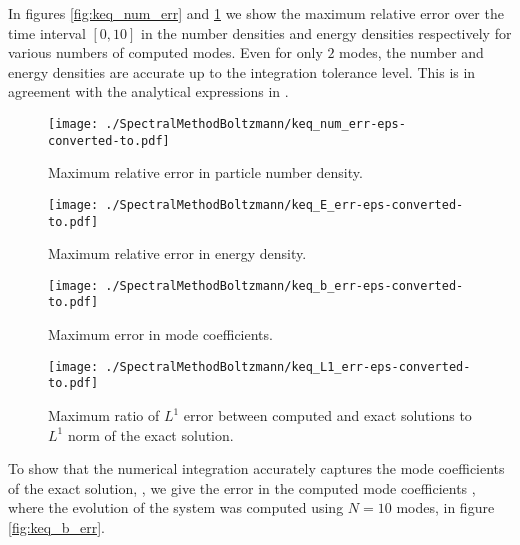In figures \ref{fig:keq_num_err} and  \ref{fig:keq_E_err} we show the maximum relative error over the time interval $[0,10]$ in the number densities and energy densities respectively for various numbers of computed modes. Even for only $2$ modes, the number and energy densities are accurate up to the integration tolerance level.  This is in agreement with the analytical expressions in .

\begin{figure}[H]
 \begin{minipage}[b]{0.5\linewidth}
\centerline{\texttt{[image: ./SpectralMethodBoltzmann/keq\_num\_err-eps-converted-to.pdf]}}
\caption{Maximum relative error in particle number density.}\label{fig:keq_num_err}
 \end{minipage}
 \hspace{0.5cm}
 \begin{minipage}[b]{0.5\linewidth}
\centerline{\texttt{[image: ./SpectralMethodBoltzmann/keq\_E\_err-eps-converted-to.pdf]}}
\caption{Maximum relative error in energy density.}\label{fig:keq_E_err}
 \end{minipage}
 \end{figure}

\begin{figure}[H]
\begin{minipage}[t]{0.5\linewidth}
\centerline{\texttt{[image: ./SpectralMethodBoltzmann/keq\_b\_err-eps-converted-to.pdf]}}
\caption{Maximum error in mode coefficients.}\label{fig:keq_b_err}
 \end{minipage}
 \hspace{0.5cm}
 \begin{minipage}[t]{0.5\linewidth}
\centerline{\texttt{[image: ./SpectralMethodBoltzmann/keq\_L1\_err-eps-converted-to.pdf]}}
\caption{Maximum ratio of $L^1$ error between computed and exact solutions to $L^1$ norm of the exact solution.}\label{fig:keq_L1_err}
 \end{minipage}
 \end{figure}


 To show that the numerical integration accurately captures the mode coefficients of the exact solution, , we give the error in the computed mode coefficients , where the evolution of the system was computed using $N=10$ modes, in figure \ref{fig:keq_b_err}. 




